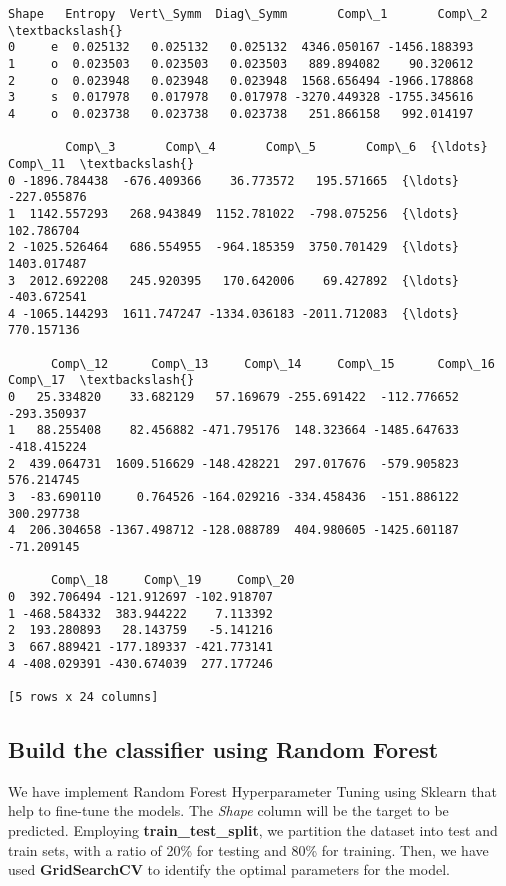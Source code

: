 \documentclass[11pt]{article}
\makeatletter
\newcommand{\boxspacing}{\kern\kvtcb@left@rule\kern\kvtcb@boxsep}
\newcommand{\prompt}[4]{
        {\ttfamily\llap{{\color{#2}[#3]:\hspace{3pt}#4}}\vspace{-\baselineskip}}
    }
\makeatother
\begin{document}
            \begin{tcolorbox}[breakable, size=fbox, boxrule=.5pt, pad at break*=1mm, opacityfill=0]
\prompt{Out}{outcolor}{7}{\boxspacing}
\begin{Verbatim}[commandchars=\\\{\}]
  Shape   Entropy  Vert\_Symm  Diag\_Symm       Comp\_1       Comp\_2  \textbackslash{}
0     e  0.025132   0.025132   0.025132  4346.050167 -1456.188393
1     o  0.023503   0.023503   0.023503   889.894082    90.320612
2     o  0.023948   0.023948   0.023948  1568.656494 -1966.178868
3     s  0.017978   0.017978   0.017978 -3270.449328 -1755.345616
4     o  0.023738   0.023738   0.023738   251.866158   992.014197

        Comp\_3       Comp\_4       Comp\_5       Comp\_6  {\ldots}      Comp\_11  \textbackslash{}
0 -1896.784438  -676.409366    36.773572   195.571665  {\ldots}  -227.055876
1  1142.557293   268.943849  1152.781022  -798.075256  {\ldots}   102.786704
2 -1025.526464   686.554955  -964.185359  3750.701429  {\ldots}  1403.017487
3  2012.692208   245.920395   170.642006    69.427892  {\ldots}  -403.672541
4 -1065.144293  1611.747247 -1334.036183 -2011.712083  {\ldots}   770.157136

      Comp\_12      Comp\_13     Comp\_14     Comp\_15      Comp\_16     Comp\_17  \textbackslash{}
0   25.334820    33.682129   57.169679 -255.691422  -112.776652 -293.350937
1   88.255408    82.456882 -471.795176  148.323664 -1485.647633 -418.415224
2  439.064731  1609.516629 -148.428221  297.017676  -579.905823  576.214745
3  -83.690110     0.764526 -164.029216 -334.458436  -151.886122  300.297738
4  206.304658 -1367.498712 -128.088789  404.980605 -1425.601187  -71.209145

      Comp\_18     Comp\_19     Comp\_20
0  392.706494 -121.912697 -102.918707
1 -468.584332  383.944222    7.113392
2  193.280893   28.143759   -5.141216
3  667.889421 -177.189337 -421.773141
4 -408.029391 -430.674039  277.177246

[5 rows x 24 columns]
\end{Verbatim}
\end{tcolorbox}
        
    \subsection{Build the classifier using Random
Forest}\label{build-the-classifier-using-random-forest}

    We have implement Random Forest Hyperparameter Tuning using Sklearn that
help to fine-tune the models. The \emph{Shape} column will be the target
to be predicted. Employing \textbf{train\_test\_split}, we partition the
dataset into test and train sets, with a ratio of 20\% for testing and
80\% for training. Then, we have used \textbf{GridSearchCV} to identify
the optimal parameters for the model.
\end{document}
